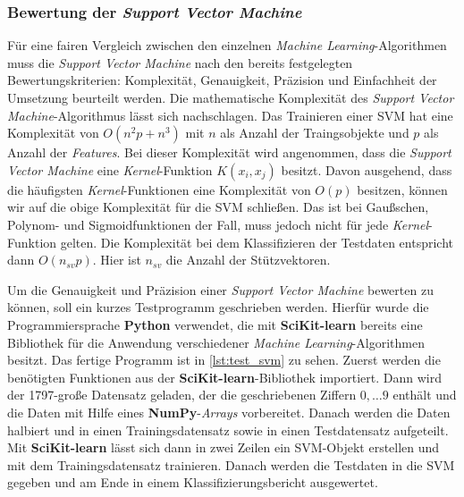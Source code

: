 \subsubsection{Bewertung der \textit{Support Vector Machine}}
Für eine fairen Vergleich zwischen den einzelnen \textit{Machine Learning}-Algorithmen muss die \textit{Support Vector Machine}
nach den bereits festgelegten Bewertungskriterien: Komplexität, Genauigkeit, Präzision und Einfachheit der Umsetzung beurteilt werden.
Die mathematische Komplexität des \textit{Support Vector Machine}-Algorithmus lässt sich nachschlagen.
Das Trainieren einer SVM hat eine Komplexität von $O(n^2 p + n^3)$ mit $n$ als Anzahl der Traingsobjekte und $p$ als Anzahl der \textit{Features}.
Bei dieser Komplexität wird angenommen, dass die \textit{Support Vector Machine} eine \textit{Kernel}-Funktion $K(x_i, x_j)$ besitzt.
Davon ausgehend, dass die häufigsten \textit{Kernel}-Funktionen eine Komplexität von $O(p)$ besitzen, können wir auf die obige Komplexität
für die SVM schließen. Das ist bei Gaußschen, Polynom- und Sigmoidfunktionen der Fall, muss jedoch nicht für jede \textit{Kernel}-Funktion gelten.
Die Komplexität bei dem Klassifizieren der Testdaten entspricht dann $O(n_{sv} p)$. Hier ist $n_{sv}$ die Anzahl der Stützvektoren.\cite{complexity}

Um die Genauigkeit und Präzision einer \textit{Support Vector Machine} bewerten zu können, soll ein kurzes Testprogramm geschrieben werden.
Hierfür wurde die Programmiersprache \textbf{Python} verwendet, die mit \textbf{SciKit-learn} bereits eine Bibliothek für die Anwendung 
verschiedener \textit{Machine Learning}-Algorithmen besitzt. Das fertige Programm ist in \ref{lst:test_svm} zu sehen.
Zuerst werden die benötigten Funktionen aus der \textbf{SciKit-learn}-Bibliothek importiert. Dann wird der 1797-große Datensatz geladen, der die
geschriebenen Ziffern $0, \dots 9$ enthält und die Daten mit Hilfe eines \textbf{NumPy}-\textit{Arrays} vorbereitet. Danach werden die Daten halbiert und in einen
Trainingsdatensatz sowie in einen Testdatensatz aufgeteilt. Mit \textbf{SciKit-learn} lässt sich dann in zwei Zeilen ein SVM-Objekt erstellen und
mit dem Trainingsdatensatz trainieren. Danach werden die Testdaten in die SVM gegeben und am Ende in einem Klassifizierungsbericht ausgewertet.

